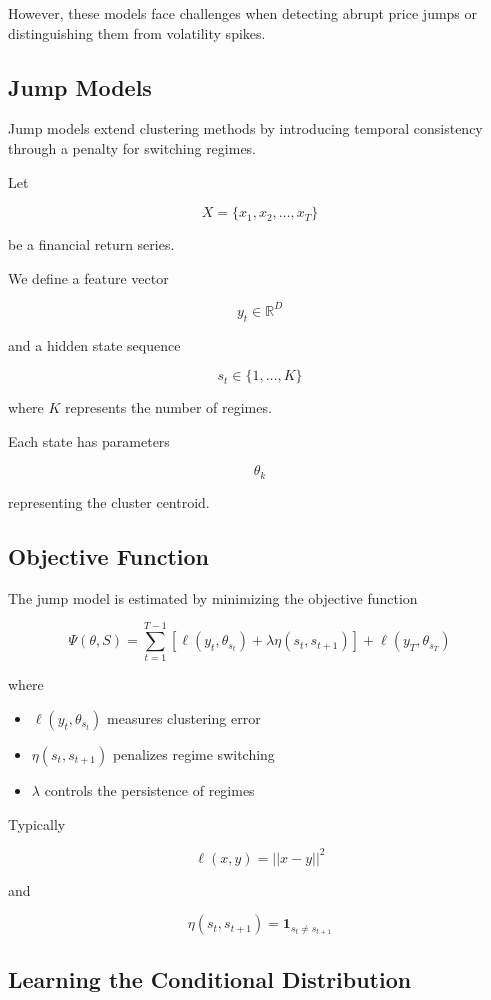 \documentclass[11pt]{article}
\begin{document}
However, these models face challenges when detecting abrupt price
jumps or distinguishing them from volatility spikes.

\subsection{Jump Models}

Jump models extend clustering methods by introducing temporal
consistency through a penalty for switching regimes.

Let

\[
X = \{x_1, x_2, \dots, x_T\}
\]

be a financial return series.

We define a feature vector

\[
y_t \in \mathbb{R}^D
\]

and a hidden state sequence

\[
s_t \in \{1, \dots, K\}
\]

where $K$ represents the number of regimes.

Each state has parameters

\[
\theta_k
\]

representing the cluster centroid.

\subsection{Objective Function}

The jump model is estimated by minimizing the objective function

\[
\Psi(\theta,S) =
\sum_{t=1}^{T-1}
\left[
\ell(y_t,\theta_{s_t})
+
\lambda \eta(s_t,s_{t+1})
\right]
+
\ell(y_T,\theta_{s_T})
\]

where

\begin{itemize}
\item $\ell(y_t,\theta_{s_t})$ measures clustering error
\item $\eta(s_t,s_{t+1})$ penalizes regime switching
\item $\lambda$ controls the persistence of regimes
\end{itemize}

Typically

\[
\ell(x,y) = ||x-y||^2
\]

and

\[
\eta(s_t,s_{t+1}) = \mathbf{1}_{s_t \neq s_{t+1}}
\]

\subsection{Learning the Conditional Distribution}
\end{document}
